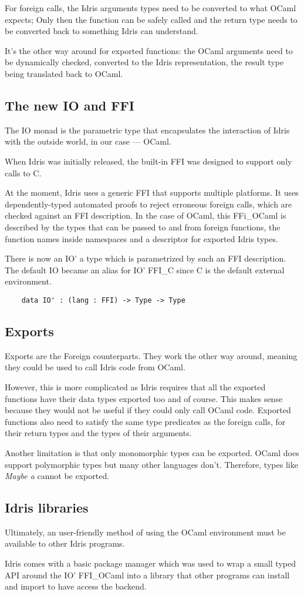 For foreign calls, the Idris arguments types need to be converted
to what OCaml expects; Only then the function can be safely
called and the return type needs to be converted back to
something Idris can understand.

It's the other way around for exported functions: the OCaml
arguments need to be dynamically checked, converted to
the Idris representation, the result type being translated back
to OCaml.

\subsection{The new IO and FFI}
The IO monad is the parametric type that encapsulates the
interaction of Idris with the outside world, in our case --- OCaml.

When Idris was initially released, the built-in FFI was designed
to support only calls to C.

At the moment, Idris uses a generic
FFI that supports multiple platforms\citep{crosscompilers}.
It uses dependently-typed automated proofs to reject erroneous
foreign calls, which are checked against an FFI description.
In the case of OCaml, this FFi\_OCaml is described by the types that can be
passed to and from foreign functions, the function names inside namespaces
and a descriptor for exported Idris types.

There is now an IO' a type which is parametrized by such an FFI description.
The default IO became an alias for IO' FFI\_C since C is the default external
environment.

\begin{verbatim}
    data IO' : (lang : FFI) -> Type -> Type 
\end{verbatim}


\subsection{Exports}
Exports are the Foreign counterparts. They work the other way around,
meaning they could be used to call Idris code from OCaml.

However, this is more complicated as Idris requires that all the exported
functions have their data types exported too and of course.
This makes sense because they would not be useful if they could only call
OCaml code.
Exported functions also need to satisfy the same type predicates as the
foreign calls, for their return types and the types of their arguments.

Another limitation is that only monomorphic types can be exported. OCaml
does support polymorphic types but many other languages don't.
Therefore, types like \emph{Maybe a} cannot be exported.

\subsection{Idris libraries}
Ultimately, an user-friendly method of using the OCaml environment must be
available to other Idris programs.

Idris comes with a basic package manager which was used to wrap a small typed
API around the IO' FFI\_OCaml into a library that other programs can install
and import to have access the backend.